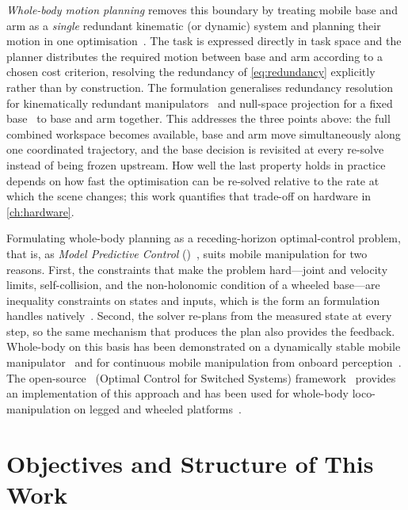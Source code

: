 \emph{Whole-body motion planning} removes this boundary by treating
mobile base and arm as a \emph{single} redundant kinematic (or dynamic)
system and planning their motion in one
optimisation~\cite{Lynch2017ModernRobotics,Haviland2022Holistic}. The
task is expressed directly in task space and the planner distributes the
required motion between base and arm according to a chosen cost
criterion, resolving the redundancy of \cref{eq:redundancy} explicitly
rather than by construction. The formulation generalises redundancy
resolution for kinematically redundant
manipulators~\cite{Siciliano2009Robotics} and null-space projection for
a fixed base~\cite{Dietrich2015NullSpace} to base and arm together.
This addresses the three points above: the full combined workspace
becomes available, base and arm move simultaneously along one
coordinated trajectory, and the base decision is revisited at every
re-solve instead of being frozen upstream. How well the last property
holds in practice depends on how fast the optimisation can be re-solved
relative to the rate at which the scene changes; this work quantifies
that trade-off on hardware in \cref{ch:hardware}.

Formulating whole-body planning as a receding-horizon optimal-control
problem, that is, as \emph{Model Predictive Control}
(\mpc{})~\cite{Rawlings2017MPC}, suits mobile manipulation for two
reasons. First, the constraints that make the problem hard---joint and
velocity limits, self-collision, and the non-holonomic condition of a
wheeled base---are inequality constraints on states and inputs, which is
the form an \mpc{} formulation handles
natively~\cite{Mayne2000Constrained}. Second, the solver re-plans from
the measured state at every step, so the same mechanism that produces
the plan also provides the feedback. Whole-body \mpc{} on this basis has
been demonstrated on a dynamically stable mobile
manipulator~\cite{Minniti2019WholeBodyMPC} and for continuous mobile
manipulation from onboard perception~\cite{Pankert2020PerceptiveMPC}.
The open-source \ocs{}~(Optimal Control for Switched Systems)
framework~\cite{ocs2Toolbox} provides an implementation of this approach
and has been used for whole-body loco-manipulation on legged and wheeled
platforms~\cite{Sleiman2021UnifiedMPC}.

\section{Objectives and Structure of This Work}
\label{sec:objectives}

